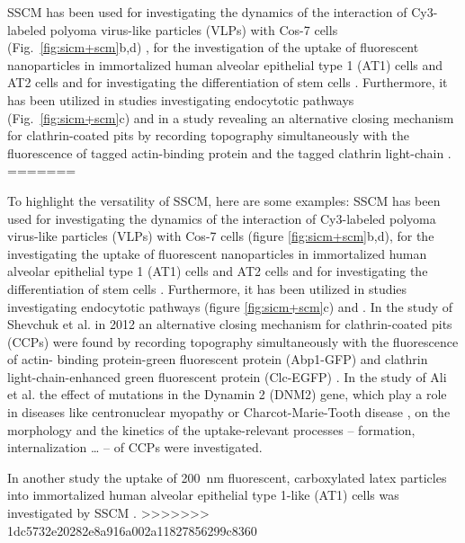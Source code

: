 SSCM has been used for investigating the dynamics of the interaction of
Cy3-labeled polyoma virus-like particles (VLPs) with Cos-7 cells
(Fig.~\ref{fig:sicm+scm}b,d) \cite{Gorelik2002a}, for the investigation of the
uptake of fluorescent nanoparticles in immortalized human alveolar epithelial
type 1 (AT1) cells and AT2 cells \cite{Kemp2008,Novak2014} and for investigating the
differentiation of stem cells \cite{Gorelik2008}. Furthermore, it has been
utilized in studies investigating endocytotic pathways \cite{Shevchuk2008}
(Fig.~\ref{fig:sicm+scm}c) and in a study revealing an alternative closing
mechanism for clathrin-coated pits by recording topography simultaneously with
the fluorescence of tagged actin-binding protein and the tagged
clathrin light-chain \cite{Shevchuk2012}.
=======

To highlight the versatility of SSCM, here are some examples: SSCM has been used for investigating 
the dynamics of the interaction of Cy3-labeled polyoma virus-like particles (VLPs) with Cos-7 
cells (figure \ref{fig:sicm+scm}b,d), for the investigating the uptake of fluorescent 
nanoparticles in immortalized human alveolar epithelial type 1 (AT1) cells and AT2 cells 
\cite{Kemp2008} and for investigating the differentiation of stem cells \cite{Gorelik2008}. 
Furthermore, it has been utilized in studies investigating endocytotic pathways 
\cite{Shevchuk2008} (figure \ref{fig:sicm+scm}c) and \cite{Shevchuk2012,Ali2019}. In the study of 
Shevchuk et al. \cite{Shevchuk2012} in 2012 an alternative closing mechanism for clathrin-coated 
pits (CCPs) were found by recording topography simultaneously with the fluorescence of actin-
binding protein-green fluorescent protein (Abp1-GFP) and clathrin light-chain-enhanced green 
fluorescent protein (Clc-EGFP) \cite{Shevchuk2012}. In the study of Ali et al. \cite{Ali2019} the 
effect of mutations in the Dynamin 2 (DNM2) gene, which play a role in diseases like centronuclear 
myopathy \cite{Bitoun2005} or Charcot-Marie-Tooth disease \cite{Zuechner2005}, on the morphology 
and the kinetics of the uptake-relevant processes -- formation, internalization … -- of CCPs were
investigated. 


In another study the uptake of 200~nm fluorescent, carboxylated latex particles into immortalized 
human alveolar epithelial type 1-like (AT1) cells was investigated by SSCM \cite{Novak2014}. 
>>>>>>> 1dc5732e20282e8a916a002a11827856299c8360


